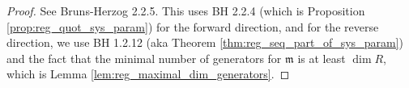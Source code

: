 \begin{proof}
  See Bruns-Herzog 2.2.5. This uses BH 2.2.4 
  (which is Proposition \ref{prop:reg_quot_sys_param}) for the forward
  direction,
  and for the reverse direction, we use BH 1.2.12 
  (aka Theorem \ref{thm:reg_seq_part_of_sys_param}) 
  and the fact that
  the minimal number of generators for $\mathfrak{m}$ is at least
  $\dim R$, which is Lemma \ref{lem:reg_maximal_dim_generators}.
\end{proof}

\begin{comment}
\subsection{Support Theory}

\begin{definition}
  \label{def:annihilator}
  The annihilator of a module M is the ideal
  of elements $r \in R$ such that $rm = 0$ for 
  all $m \in M$.
\end{definition}

\begin{definition}
  \label{def:support_module}
  The support of a module is the set of prime ideals
  $\mathfrak{p} \ins R$ such that 
  $M_{\mathfrak{p}} \neq 0$.
\end{definition}

\begin{lemma}
  \label{lem:annihilator_zero_locus_support}
  \uses{def:annihilator,def:support_module}
  The zero locus of the annihilator of a module
  is the same as the support of that module.
  I.e. the set of prime ideals containing the 
  $\Ann_R(M)$ is the support of $M$.
\end{lemma}

\begin{proof}
  omitted for now
\end{proof}

\subsection{Selected Results on Primary Decomposition}

\begin{definition}
    \label{def:primary}
    Given a prime ideal \(\mathfrak{p}\) of the ring \(R\),
    an ideal \(I\) is \(\mathfrak{p}\)-primary if
    for all \(x, y \in I\), either \(x \in I\) or \(y^n \in I\)
    for some \(n\).
    (This is already in mathlib)
\end{definition}


\end{comment}
